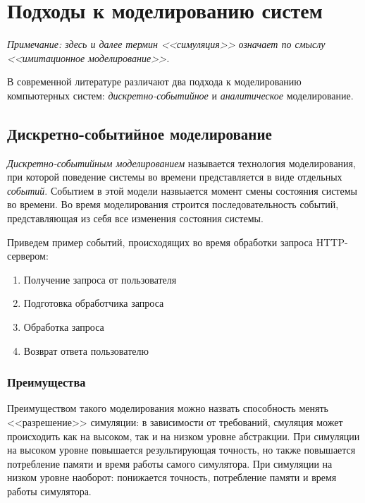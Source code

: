 \documentclass[../diploma.tex]{subfile}
\begin{document}
    \section{Подходы к моделированию систем}
    \label{sec:simulation_methods}
    
    \textit{
        Примечание: здесь и далее термин <<симуляция>> означает по смыслу
        <<имитационное моделирование>>.
    }

    В современной литературе различают два подхода к моделированию компьютерных
    систем: \textit{дискретно-событийное} и \textit{аналитическое}
    моделирование.

    \subsection{Дискретно-событийное моделирование}
    \label{sec:simulation_methods:subsec:discrete_event_modeling}

    \textit{Дискретно-событийным моделированием} называется технология
    моделирования, при которой поведение системы во времени представляется в
    виде отдельных \textit{событий}. Событием в этой модели назвыается момент
    смены состояния системы во времени. Во время моделирования строится
    последовательность событий, представляющая из себя все изменения состояния
    системы. 
    
    Приведем пример событий, происходящих во время обработки запроса
    HTTP-сервером: 
    
    \begin{enumerate}
        \item Получение запроса от пользователя
        \item Подготовка обработчика запроса
        \item Обработка запроса
        \item Возврат ответа пользователю
    \end{enumerate}
    
    \subsubsection{Преимущества}

    Преимуществом такого моделирования можно назвать способность менять
    <<разрешение>> симуляции: в зависимости от требований, смуляция может
    происходить как на высоком, так и на низком уровне абстракции. При
    симуляции на высоком уровне повышается результирующая точность, но также
    повышается потребление памяти и время работы самого симулятора. При
    симуляции на низком уровне наоборот: понижается точность, потребление памяти
    и время работы симулятора.
\end{document}
